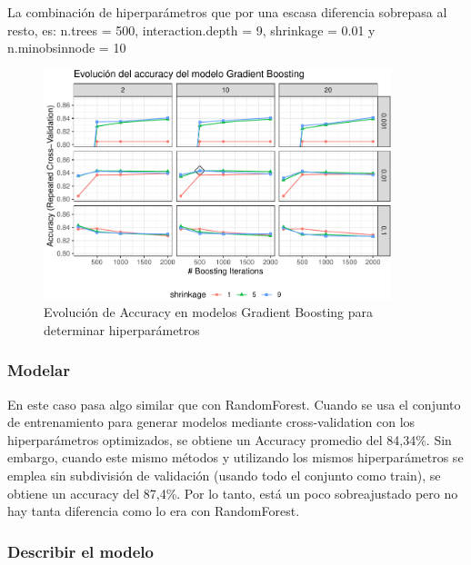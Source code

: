 La combinación de hiperparámetros
que por una escasa diferencia sobrepasa al resto, es: n.trees = 500,
interaction.depth = 9, shrinkage = 0.01 y n.minobsinnode = 10


\begin{figure}[!htb]
	\centering
	\includegraphics[width=0.9\textwidth]{imagenes/modelos_varios/unnamed-chunk-28-1.pdf}
	\caption{Evolución de Accuracy en modelos Gradient Boosting para determinar hiperparámetros}
	\label{fig:rf_hiperparam}
\end{figure}


\subsubsection{Modelar}

En este caso pasa algo similar que con RandomForest. Cuando se usa el conjunto de entrenamiento para generar modelos mediante cross-validation con los hiperparámetros optimizados, se obtiene un Accuracy promedio del 84,34\%. Sin embargo, cuando este mismo métodos y utilizando los mismos hiperparámetros se emplea sin subdivisión de validación (usando todo el conjunto como train), se obtiene un accuracy del 87,4\%. Por lo tanto, está un poco sobreajustado pero no hay tanta diferencia como lo era con RandomForest.





\subsubsection{Describir el modelo}

